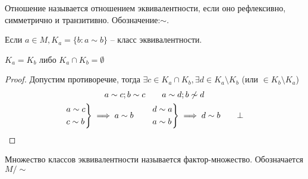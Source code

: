 \documentclass[main]{subfiles}
\begin{document}
\begin{definition}
    Отношение называется отношением эквивалентности, если оно рефлексивно,
    симметрично и транзитивно. Обозначение:$\sim$.
\end{definition}

\begin{definition}
    Если $a \in M, K_a = \{b: a \sim b\}$ -- класс эквивалентности.
\end{definition}

\begin{theorem}
    $K_a = K_b$ либо $K_a \cap K_b = \emptyset$
\end{theorem}
\begin{proof}
    Допустим противоречие, тогда $\exists c \in K_a \cap K_b,
        \exists d \in K_a \setminus K_b$ (или $\in K_b \setminus K_a$)
    \begin{gather*}
        a\sim c; b\sim c \qquad a \sim d; b \not\sim d\\
        \begin{rcases}
            a\sim c \\
            c\sim b
        \end{rcases} \implies a\sim b \qquad
        \begin{rcases}
            d \sim a \\
            a \sim b
        \end{rcases} \implies d \sim b \qquad\bot
    \end{gather*}
\end{proof}

\begin{definition}
    Множество классов эквивалентности называется фактор-множество. Обозначается $M/\sim$
\end{definition}
\end{document}
